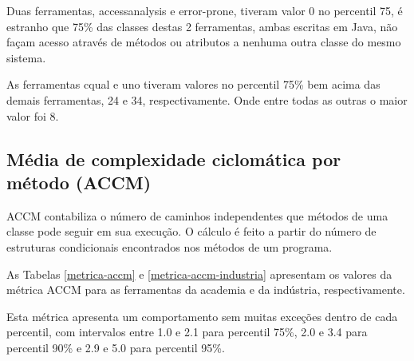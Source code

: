 Duas ferramentas, accessanalysis e error-prone, tiveram valor 0 no percentil
75, é estranho que 75\% das classes destas 2 ferramentas, ambas escritas em
Java, não façam acesso através de métodos ou atributos a nenhuma outra classe
do mesmo sistema.


As ferramentas cqual e uno tiveram valores no percentil 75\% bem acima das
demais ferramentas, 24 e 34, respectivamente. Onde entre todas as outras o
maior valor foi 8.

\subsection{Média de complexidade ciclomática por método (ACCM)}

ACCM contabiliza o número de caminhos independentes que métodos de uma classe
pode seguir em sua execução. O cálculo é feito a partir do número de
estruturas condicionais encontrados nos métodos de um programa.

As Tabelas \ref{metrica-accm} e \ref{metrica-accm-industria} apresentam os
valores da métrica ACCM para as ferramentas da academia e da indústria,
respectivamente.


Esta métrica apresenta um comportamento sem muitas exceções dentro de cada
percentil, com intervalos entre 1.0 e 2.1 para percentil 75\%, 2.0 e 3.4 para
percentil 90\% e 2.9 e 5.0 para percentil 95\%.


